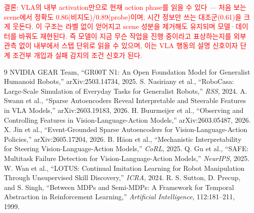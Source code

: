 \documentclass[a4paper,twocolumn,9pt]{extarticle}
\makeatletter
\newcommand{\new}[1]{\textcolor{red}{#1}}
\renewcommand\section{\@startsection{section}{1}{\z@}%
  {1.2ex plus .5ex}{0.8ex plus .3ex}{\centering\normalsize\bfseries}}
\makeatother
\begin{document}
\new{결론: VLA의 내부 activation만으로 현재 action phase를 읽을 수 있다 --- 처음 보는
scene에서 정확도 0.86(비지도)/0.89(probe)이며, 시간 정보만 쓰는 대조군(0.61)을 크게
웃돈다. 이 구조는 라벨 없이 얻어지고 scene 성분을 제거해도 유지되며 모델·데이터를 바꿔도
재현된다. 즉 모델이 지금 무슨 작업을 진행 중이라고 표상하는지를 외부 관측 없이 내부에서
스텝 단위로 읽을 수 있으며, 이는 VLA 행동의 설명 신호이자 단계 조건부 개입과 실패 감지의
조건 신호가 된다.}


\begin{thebibliography}{9}\footnotesize\setlength{\itemsep}{1pt}
 NVIDIA GEAR Team, ``GR00T N1: An Open Foundation Model for
Generalist Humanoid Robots,'' arXiv:2503.14734, 2025.
 S. Nasiriany et al., ``RoboCasa: Large-Scale Simulation of
Everyday Tasks for Generalist Robots,'' \textit{RSS}, 2024.
 A. Swann et al., ``Sparse Autoencoders Reveal Interpretable and
Steerable Features in VLA Models,'' arXiv:2603.19183, 2026.
 H. Buurmeijer et al., ``Observing and Controlling Features in
Vision-Language-Action Models,'' arXiv:2603.05487, 2026.
 X. Jin et al., ``Event-Grounded Sparse Autoencoders for
Vision-Language-Action Policies,'' arXiv:2605.17204, 2026.
 B. H\"aon et al., ``Mechanistic Interpretability for Steering
Vision-Language-Action Models,'' \textit{CoRL}, 2025.
 Q. Gu et al., ``SAFE: Multitask Failure Detection for
Vision-Language-Action Models,'' \textit{NeurIPS}, 2025.
 W. Wan et al., ``LOTUS: Continual Imitation Learning for Robot
Manipulation Through Unsupervised Skill Discovery,'' \textit{ICRA}, 2024.
 R. S. Sutton, D. Precup, and S. Singh, ``Between MDPs and
Semi-MDPs: A Framework for Temporal Abstraction in Reinforcement Learning,''
\textit{Artificial Intelligence}, 112:181--211, 1999.
\end{thebibliography}
\end{document}
